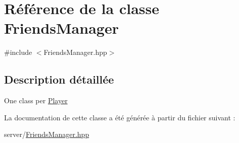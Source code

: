 \hypertarget{classFriendsManager}{}\section{Référence de la classe Friends\+Manager}
\label{classFriendsManager}


{\ttfamily \#include $<$Friends\+Manager.\+hpp$>$}



\subsection{Description détaillée}
One class per \hyperlink{classPlayer}{Player} 

La documentation de cette classe a été générée à partir du fichier suivant \+:\begin{DoxyCompactItemize}
\item 
server/\hyperlink{FriendsManager_8hpp}{Friends\+Manager.\+hpp}\end{DoxyCompactItemize}
